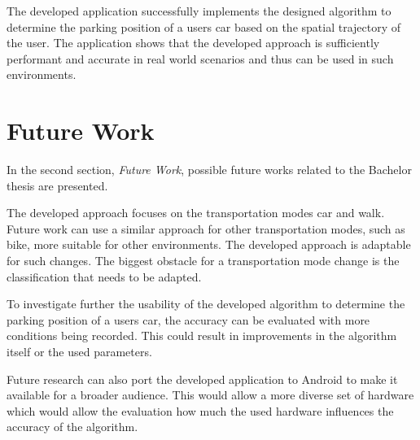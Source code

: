 
The developed application successfully implements the designed algorithm to determine the parking position of a users car based on the spatial trajectory of the user. The application shows that the developed approach is sufficiently performant and accurate in real world scenarios and thus can be used in such environments. 

\section{Future Work}
In the second section, \textit{Future Work}, possible future works related to the Bachelor thesis are presented. 

The developed approach focuses on the transportation modes car and walk. Future work can use a similar approach for other transportation modes, such as bike, more suitable for other environments. The developed approach is adaptable for such changes. The biggest obstacle for a transportation mode change is the classification that needs to be adapted.

To investigate further the usability of the developed algorithm to determine the parking position of a users car, the accuracy can be evaluated with more conditions being recorded. This could result in improvements in the algorithm itself or the used parameters. 

Future research can also port the developed application to Android to make it available for a broader audience. This would allow a more diverse set of hardware which would allow the evaluation how much the used hardware influences the accuracy of the algorithm.


